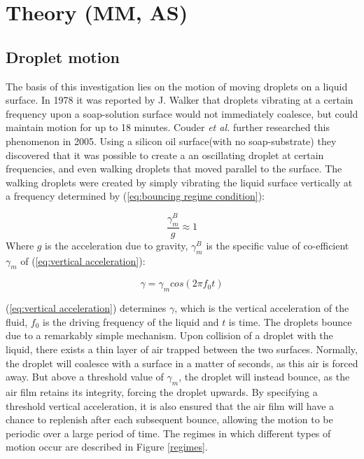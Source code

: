 \section{Theory (MM, AS)}
\subsection{Droplet motion}
The basis of this investigation lies on the motion of moving droplets on a liquid surface. In 1978 it was reported by J. Walker \cite{Walker} that droplets vibrating at a certain frequency upon a soap-solution surface would not immediately coalesce, but could maintain motion for up to 18 minutes. Couder \textit{et al.} further researched this phenomenon in 2005. Using a silicon oil surface(with no soap-substrate) they discovered that it was possible to create a   an oscillating droplet at certain frequencies, and even walking droplets that moved parallel to the surface. 
The walking droplets were created by simply vibrating the liquid surface vertically at a frequency determined by (\ref{eq:bouncing regime condition}):

\begin{equation} \label{eq:bouncing regime condition}
\frac{\gamma_{m}^{B}}{g}\approx 1
\end{equation}
Where $g$ is the acceleration due to gravity, $\gamma_{m}^{B}$ is the specific value of co-efficient $\gamma_{m}$ of (\ref{eq:vertical acceleration}):


\begin{equation} \label{eq:vertical acceleration}
\gamma=\gamma_{m}cos(2 \pi f_0t) 
\end{equation}

(\ref{eq:vertical acceleration}) determines $\gamma$, which is the vertical acceleration of the fluid, $f_0$ is the driving frequency of the liquid and $t$ is time. The droplets bounce due to a remarkably simple mechanism. Upon collision of a droplet with the liquid, there exists a thin layer of air trapped between the two surfaces. Normally, the droplet will coalesce with a surface in a matter of seconds, as this air is forced away. But above a threshold value of $\gamma_{m}$, the droplet will instead bounce, as the air film retains its integrity, forcing the droplet upwards. By specifying a threshold vertical acceleration, it is also ensured that the air film will have a chance to replenish after each subsequent bounce, allowing the motion to be periodic over a large period of time. The regimes in which different types of motion occur are described in Figure \ref{regimes}.

